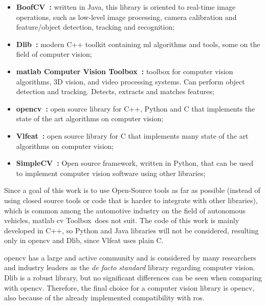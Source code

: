 \begin{itemize}
	\item \textbf{BoofCV~\cite{boofcv}:} written in Java, this library is oriented to real-time image operations, such as low-level image processing, camera calibration and feature/object  detection, tracking and recognition;
	\item \textbf{Dlib~\cite{dlib}:} modern C++ toolkit containing \acl{ml} algorithms and tools, some on the field of computer vision;
	\item \textbf{\ac{matlab} Computer Vision Toolbox\texttrademark~\cite{matlabcvtoolbox}:} toolbox for computer vision algorithms, 3D vision, and video processing systems. Can perform object detection and tracking. Detects, extracts and matches features;
	\item \textbf{\acf{opencv}~\cite{opencv}:} open source library for C++, Python and C that implements the state of the art algorithms on computer vision;
	\item \textbf{Vlfeat~\cite{vlfeat}:} open source library for C that implements many state of the art algorithms on computer vision;
	\item \textbf{SimpleCV~\cite{simplecv}:} Open source framework, written in Python, that can be used to implement computer vision software using other libraries;
\end{itemize}

Since a goal of this work is to use Open-Source tools as far as possible (instead of using closed source tools or code that is harder to integrate with other libraries), which is common among the automotive industry on the field of autonomous vehicles, \ac{matlab} \acl{cv} Toolbox\texttrademark~does not suit. The code of this work is mainly developed in C++, so Python and Java libraries will not be considered, resulting only in \ac{opencv} and Dlib, since Vlfeat uses plain C. 

\ac{opencv} has a large and active community and is considered by many researchers and industry leaders as the \textit{de facto standard} library regarding computer vision. Dlib is a robust library, but no significant differences can be seen when comparing with \ac{opencv}. Therefore, the final choice for a computer vision library is \ac{opencv}, also because of the already implemented compatibility with \ac{ros}.





